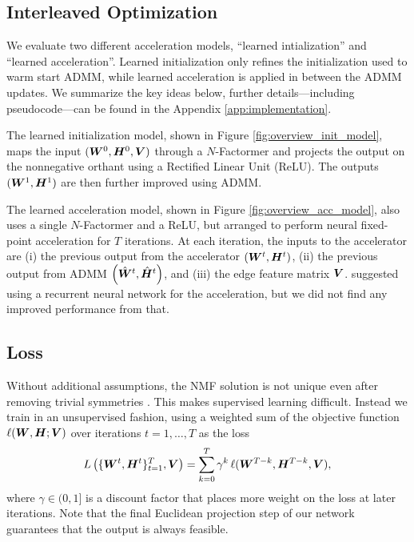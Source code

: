 \documentclass{article}
\begin{document}
\subsection{Interleaved Optimization}
We evaluate two different acceleration models, ``learned intialization'' and ``learned acceleration''. Learned initialization only refines the initialization used to warm start ADMM, while learned acceleration is applied in between the ADMM updates. We summarize the key ideas below, further details---including pseudocode---can be found in the Appendix \ref{app:implementation}.

The learned initialization model, shown in Figure \ref{fig:overview_init_model}, maps the input $({\bm{W}}^0, {\bm{H}}^0, {\bm{V}} )$ through a $N$-Factormer and projects the output on the nonnegative orthant using a Rectified Linear Unit (ReLU). The outputs $({\bm{W}}^1, {\bm{H}}^1)$ are then further improved using ADMM. 

The learned acceleration model, shown in Figure \ref{fig:overview_acc_model}, also uses a single $N$-Factormer and a ReLU, but arranged to perform neural fixed-point acceleration \citep{Venkataraman2021} for $T$ iterations. At each iteration, the inputs to the accelerator are (i) the previous output from the accelerator $({\bm{W}}^t,{\bm{H}}^t)$, (ii) the previous output from ADMM $\left(\hat{{\bm{W}}}^t,\hat{{\bm{H}}}^t\right)$, and (iii) the edge feature matrix ${\bm{V}}$. \citet{Venkataraman2021} suggested using a recurrent neural network for the acceleration, but we did not find any improved performance from that. %

\subsection{Loss}
Without additional assumptions, the NMF solution is not unique even after removing trivial symmetries \citep{Huang2013}. This makes supervised learning difficult. Instead we train in an unsupervised fashion, using a weighted sum of the objective function $\ell({\bm{W}}, {\bm{H}}; {\bm{V}})$ over iterations $t=1,\ldots, T$ as the loss \citep{Andrychowicz2016}
\begin{equation}
    L\left(\{{\bm{W}}^t,{\bm{H}}^t\}_{t=1}^T, {\bm{V}}\right) = \sum_{k=0}^{T} \gamma^k \,\ell({\bm{W}}^{T-k}, {\bm{H}}^{T-k}, {\bm{V}}),
\end{equation}
where $\gamma\in (0, 1]$ is a discount factor that places more weight on the loss at later iterations. Note that the final Euclidean projection step of our network guarantees that the output is always feasible.
\end{document}
